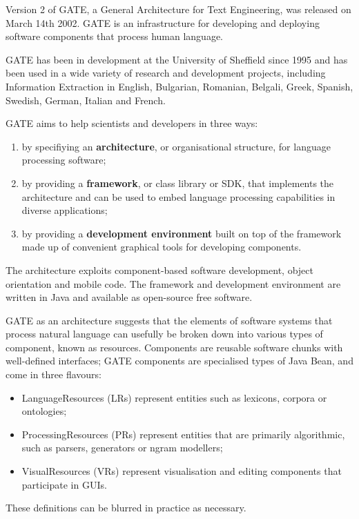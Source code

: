%
%
%
%

Version 2 of GATE, a General Architecture for Text Engineering, was released
on March 14th 2002.
GATE is an infrastructure for developing and deploying software components 
that process human language.

GATE has been in development at the University of Sheffield since
1995 and has been used in a wide variety of research and development
projects, including Information Extraction in English,
Bulgarian, Romanian, Belgali,
Greek, Spanish, Swedish, German, Italian and French.

GATE aims to help scientists and developers in three ways:
%
\begin{enumerate}
%
\item
by specifiying an {\bf architecture}, or organisational structure,
for language processing software;
%
\item
by providing a {\bf framework}, or class library or SDK,
that implements the architecture and can be used
to embed language processing capabilities in diverse applications;
%
\item
by providing a {\bf development environment} built on top of the framework 
made up of convenient graphical tools for developing components.
\end{enumerate}
%
The architecture exploits component-based software development,
object orientation and mobile code. The framework and development
environment are written in Java and available as open-source free software.

GATE as an architecture suggests that the elements of software systems that
process natural language can usefully be broken down into various types of
component, known as resources.  Components
are reusable software chunks with well-defined interfaces; 
GATE components are specialised types of Java Bean, and come in
three flavours:
%
\begin{itemize}
%
\item 
LanguageResources (LRs) represent entities such as lexicons, corpora or
ontologies;
%
\item 
ProcessingResources (PRs) represent entities that are primarily algorithmic,
such as parsers, generators or ngram modellers;
%
\item 
VisualResources (VRs) represent visualisation and editing components that
participate in GUIs.
%
\end{itemize}
%
These definitions can be blurred in practice as necessary.


